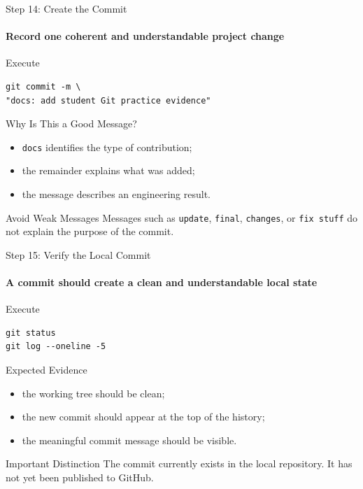 \begin{frame}[fragile]{Step 14: Create the Commit}
\framesubtitle{Record one coherent and understandable project change}

\footnotesize

\begin{block}{Execute}
\begin{verbatim}
git commit -m \
"docs: add student Git practice evidence"
\end{verbatim}
\end{block}

\begin{exampleblock}{Why Is This a Good Message?}
\begin{itemize}
    \setlength{\itemsep}{0.18em}
    \item \texttt{docs} identifies the type of contribution;
    \item the remainder explains what was added;
    \item the message describes an engineering result.
\end{itemize}
\end{exampleblock}

\begin{alertblock}{Avoid Weak Messages}
Messages such as \texttt{update}, \texttt{final}, \texttt{changes}, or
\texttt{fix stuff} do not explain the purpose of the commit.
\end{alertblock}

\end{frame}

\begin{frame}[fragile]{Step 15: Verify the Local Commit}
\framesubtitle{A commit should create a clean and understandable local state}

\footnotesize

\begin{block}{Execute}
\begin{verbatim}
git status
git log --oneline -5
\end{verbatim}
\end{block}

\begin{exampleblock}{Expected Evidence}
\begin{itemize}
    \setlength{\itemsep}{0.18em}
    \item the working tree should be clean;
    \item the new commit should appear at the top of the history;
    \item the meaningful commit message should be visible.
\end{itemize}
\end{exampleblock}

\begin{alertblock}{Important Distinction}
The commit currently exists in the local repository. It has not yet been
published to GitHub.
\end{alertblock}

\end{frame}

